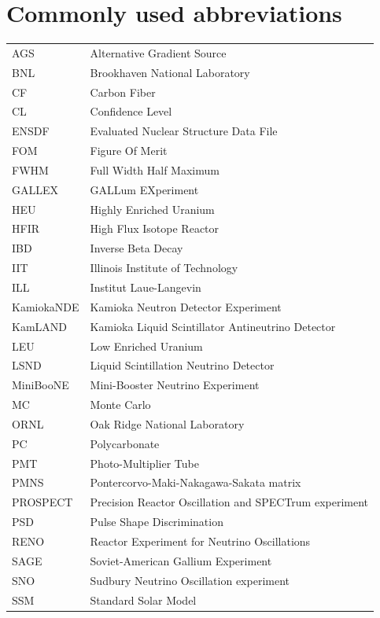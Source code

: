 \documentclass[11pt]{article}
\numberwithin{equation}{section}
\begin{document}
\section*{Commonly used abbreviations}
\label{sec:intro}
 \begin{tabular}{*2{l}}
 
AGS  & Alternative Gradient Source\\
BNL & Brookhaven National Laboratory\\
CF & Carbon Fiber \\
CL & Confidence Level \\
ENSDF & Evaluated Nuclear Structure Data File\\
FOM & Figure Of Merit \\
FWHM & Full Width Half Maximum \\
GALLEX & GALLum EXperiment\\
HEU & Highly Enriched Uranium\\
HFIR & High Flux Isotope Reactor \\
IBD & Inverse Beta Decay\\
IIT & Illinois Institute of Technology \\
ILL & Institut Laue-Langevin\\
KamiokaNDE & Kamioka Neutron Detector Experiment\\
KamLAND & Kamioka Liquid Scintillator Antineutrino Detector \\
LEU & Low Enriched Uranium \\
LSND & Liquid Scintillation Neutrino Detector \\
MiniBooNE &Mini-Booster Neutrino Experiment \\
MC & Monte Carlo \\
ORNL & Oak Ridge National Laboratory\\
PC & Polycarbonate \\
PMT & Photo-Multiplier Tube \\
PMNS & Pontercorvo-Maki-Nakagawa-Sakata matrix\\
PROSPECT & Precision Reactor Oscillation and SPECTrum  experiment\\
PSD & Pulse Shape Discrimination \\
RENO & Reactor Experiment for Neutrino Oscillations \\
SAGE & Soviet-American Gallium Experiment \\
SNO & Sudbury Neutrino Oscillation experiment\\
SSM  & Standard Solar Model \\


\end{tabular}
\end{document}
